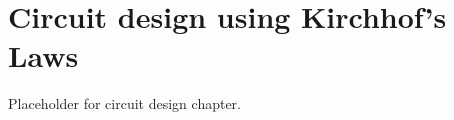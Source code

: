 \setchapterpreamble[u]{\margintoc}
\chapter{Circuit design using Kirchhof's Laws}

Placeholder for circuit design chapter.